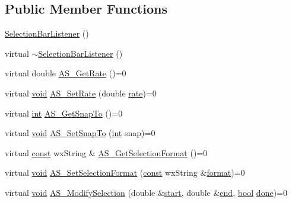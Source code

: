 \subsection*{Public Member Functions}
\begin{DoxyCompactItemize}
\item 
\hyperlink{class_selection_bar_listener_a378b7c3a65a44c34c5bcd1590bcff8b0}{Selection\+Bar\+Listener} ()
\item 
virtual \hyperlink{class_selection_bar_listener_a0702837e81990de9e3b548507d9a8071}{$\sim$\+Selection\+Bar\+Listener} ()
\item 
virtual double \hyperlink{class_selection_bar_listener_aa756eb83a78be13268f4e885fce76055}{A\+S\+\_\+\+Get\+Rate} ()=0
\item 
virtual \hyperlink{sound_8c_ae35f5844602719cf66324f4de2a658b3}{void} \hyperlink{class_selection_bar_listener_a120c24b0fc83963e892f690e19f5852f}{A\+S\+\_\+\+Set\+Rate} (double \hyperlink{seqread_8c_ad89d3fac2deab7a9cf6cfc8d15341b85}{rate})=0
\item 
virtual \hyperlink{xmltok_8h_a5a0d4a5641ce434f1d23533f2b2e6653}{int} \hyperlink{class_selection_bar_listener_a41538f45c1653cf5e34464eae4524847}{A\+S\+\_\+\+Get\+Snap\+To} ()=0
\item 
virtual \hyperlink{sound_8c_ae35f5844602719cf66324f4de2a658b3}{void} \hyperlink{class_selection_bar_listener_a2aba133e955ff817ec34ed0a59240a79}{A\+S\+\_\+\+Set\+Snap\+To} (\hyperlink{xmltok_8h_a5a0d4a5641ce434f1d23533f2b2e6653}{int} snap)=0
\item 
virtual \hyperlink{getopt1_8c_a2c212835823e3c54a8ab6d95c652660e}{const} wx\+String \& \hyperlink{class_selection_bar_listener_a1dad0c9b7bd74276fb29346875b82df4}{A\+S\+\_\+\+Get\+Selection\+Format} ()=0
\item 
virtual \hyperlink{sound_8c_ae35f5844602719cf66324f4de2a658b3}{void} \hyperlink{class_selection_bar_listener_adb11b377fd23a819bf04fea7e769b6a7}{A\+S\+\_\+\+Set\+Selection\+Format} (\hyperlink{getopt1_8c_a2c212835823e3c54a8ab6d95c652660e}{const} wx\+String \&\hyperlink{_export_p_c_m_8cpp_a317afff57d87a89158c2b038d37b2b08}{format})=0
\item 
virtual \hyperlink{sound_8c_ae35f5844602719cf66324f4de2a658b3}{void} \hyperlink{class_selection_bar_listener_a1d2c2029589fa6445486b7bc938058f7}{A\+S\+\_\+\+Modify\+Selection} (double \&\hyperlink{seqread_8c_ac503262ae470564980711da4f78b1181}{start}, double \&\hyperlink{convtest_8m_afb358f48b1646c750fb9da6c6585be2b}{end}, \hyperlink{mac_2config_2i386_2lib-src_2libsoxr_2soxr-config_8h_abb452686968e48b67397da5f97445f5b}{bool} \hyperlink{mm_8c_a5f689029e53f12e337967312e0a17717}{done})=0
\end{DoxyCompactItemize}


